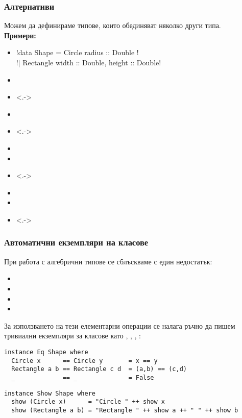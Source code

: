 \documentclass[alsotrans]{beamerswitch}
\begin{document}
\begin{frame}[fragile]
  \frametitle{Алтернативи}
  Можем да дефинираме типове, които обединяват няколко други типа.\\
  \pause
  \textbf{Примери:}
  \begin{itemize}[<+->]
  \item \lst!data Shape = Circle { radius :: Double } !\\
    \hspace{10ex}\lst!| Rectangle { width :: Double, height :: Double}!
  \item {}
  \item<.-> 
  \item {}
  \item<.-> 
  \item {}
  \item {}
  \item<.-> 
  \item {}
  \item {}
  \item<.-> 
  \end{itemize}
\end{frame}

\begin{frame}[fragile]
  \frametitle{Автоматични екземпляри на класове}

  При работа с алгебрични типове се сблъскваме с един недостатък:\pause
  \begin{itemize}[<+->]
  \item {}
  \item {}
  \item {}
  \item {}
  \end{itemize}
  \onslide<+->
  За използването на тези елементарни операции се налага ръчно да пишем тривиални екземпляри за класове като , , , :
  \onslide<+->
  \small
\begin{lstlisting}
instance Eq Shape where
  Circle x      == Circle y       = x == y
  Rectangle a b == Rectangle c d  = (a,b) == (c,d)
  _             == _              = False
\end{lstlisting}
  \onslide<+->
\begin{lstlisting}
instance Show Shape where
  show (Circle x)      = "Circle " ++ show x
  show (Rectangle a b) = "Rectangle " ++ show a ++ " " ++ show b
\end{lstlisting}
\end{frame}
\end{document}
